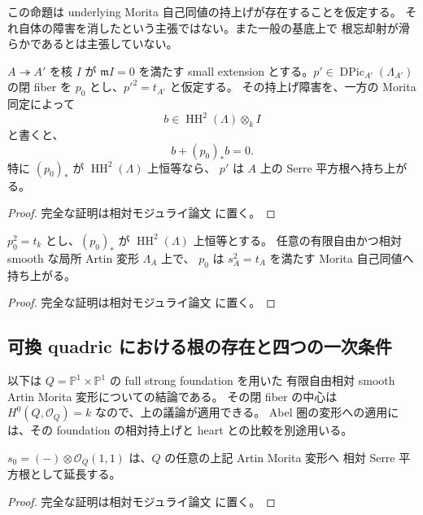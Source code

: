 この命題は underlying Morita 自己同値の持上げが存在することを仮定する。
それ自体の障害を消したという主張ではない。また一般の基底上で
根忘却射が滑らかであるとは主張していない。

\begin{lemma}[合成と持上げ障害]
\label{lem:root-obstruction-composition}
$A\twoheadrightarrow A'$ を核 $I$ が $\mathfrak m I=0$ を満たす
small extension とする。$p'\in\operatorname{DPic}_{A'}(\Lambda_{A'})$
の閉 fiber を $p_0$ とし、$p'^2=t_{A'}$ と仮定する。
その持上げ障害を、一方の Morita 同定によって
\[
 b\in\operatorname{HH}^2(\Lambda)\otimes_kI
\]
と書くと、
\[
 b+(p_0)_*b=0.
\]
特に $(p_0)_*$ が $\operatorname{HH}^2(\Lambda)$ 上恒等なら、
$p'$ は $A$ 上の Serre 平方根へ持ち上がる。
\end{lemma}
\begin{proof}
完全な証明は相対モジュライ論文 \cite[\texttt{artin_roots}]{QuadricModuli2026} に置く。
\end{proof}

\begin{corollary}
\label{cor:hhtrivial-root-artin}
$p_0^2=t_k$ とし、$(p_0)_*$ が $\operatorname{HH}^2(\Lambda)$ 上恒等とする。
任意の有限自由かつ相対 smooth な局所 Artin 変形 $\Lambda_A$ 上で、
$p_0$ は $s_A^2=t_A$ を満たす Morita 自己同値へ持ち上がる。
\end{corollary}
\begin{proof}
完全な証明は相対モジュライ論文 \cite[\texttt{artin_roots}]{QuadricModuli2026} に置く。
\end{proof}

\subsection{可換 quadric における根の存在と四つの一次条件}

以下は $Q=\mathbb P^1\times\mathbb P^1$ の full strong foundation を用いた
有限自由相対 smooth Artin Morita 変形についての結論である。
その閉 fiber の中心は $H^0(Q,\mathcal O_Q)=k$ なので、上の議論が適用できる。
Abel 圏の変形への適用には、その foundation の相対持上げと
heart との比較を別途用いる。

\begin{proposition}
\label{prop:quadric-root-all-artin}
$s_0=(-)\otimes\mathcal O_Q(1,1)$ は、$Q$ の任意の上記 Artin Morita 変形へ
相対 Serre 平方根として延長する。
\end{proposition}
\begin{proof}
完全な証明は相対モジュライ論文 \cite[\texttt{artin_roots}]{QuadricModuli2026} に置く。
\end{proof}

